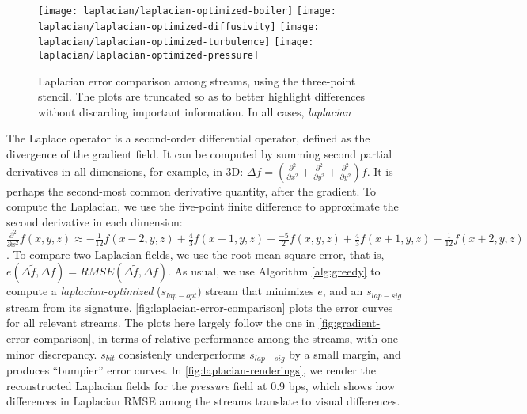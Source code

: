 \begin{figure}[h]
	\centering
	{\texttt{[image: laplacian/laplacian-optimized-boiler]}}
	{\texttt{[image: laplacian/laplacian-optimized-diffusivity]}}
	{\texttt{[image: laplacian/laplacian-optimized-turbulence]}}
	{\texttt{[image: laplacian/laplacian-optimized-pressure]}}
	\caption{Laplacian error comparison among streams, using the three-point stencil. The plots are
	truncated so as to better highlight differences without discarding important information. In all
	cases, \emph{laplacian}}\label{fig:laplacian-error-comparison}
\end{figure}

The Laplace operator is a second-order differential operator, defined as the divergence of the
gradient field. It can be computed by summing second partial derivatives in all dimensions, for
example, in 3D: $\Delta
f=(\frac{{\partial}^2}{\partial{x^2}}+\frac{{\partial}^2}{\partial{y^2}}+\frac{{\partial}^2}{\partial{y^2}})f$.
It is perhaps the second-most common derivative quantity, after the gradient. To compute the
Laplacian, we use the five-point finite difference to approximate the second derivative in each
dimension: $\frac{{\partial}^2}{\partial{x^2}}f(x,y,z) \approx
-\frac{1}{12}f(x-2,y,z)+\frac{4}{3}f(x-1,y,z)+\frac{-5}{2}f(x,y,z)+\frac{4}{3}f(x+1,y,z)-\frac{1}{12}f(x+2,y,z)$.
To compare two Laplacian fields, we use the root-mean-square error, that is, $e(\Delta
\tilde{f},\Delta f)=RMSE(\Delta \tilde{f},\Delta f)$. As usual, we use Algorithm \autoref{alg:greedy}
to compute a \emph{laplacian-optimized} ($s_{lap-opt}$) stream that minimizes $e$, and an
$s_{lap-sig}$ stream from its signature. \autoref{fig:laplacian-error-comparison} plots the error
curves for all relevant streams. The plots here largely follow the one in
\autoref{fig:gradient-error-comparison}, in terms of relative performance among the streams, with
one minor discrepancy. $s_{bit}$ consistenly underperforms $s_{lap-sig}$ by a small margin, and
produces ``bumpier'' error curves. In \autoref{fig:laplacian-renderings}, we render the
reconstructed Laplacian fields for the \emph{pressure} field at 0.9 bps, which shows how differences
in Laplacian RMSE among the streams translate to visual differences.


